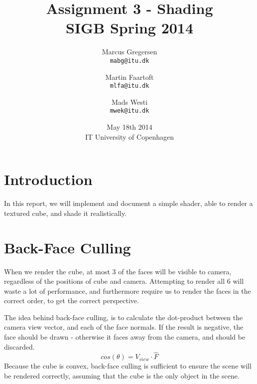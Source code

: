 \documentclass[a4paper,11pt]{article}
\begin{document}
\date{May 18th 2014\\ IT University of Copenhagen}
\title{Assignment 3 - Shading\\SIGB Spring 2014}

\author{Marcus Gregersen\\
\texttt{mabg@itu.dk}
\and Martin Faartoft\\
\texttt{mlfa@itu.dk}
\and Mads Westi\\
\texttt{mwek@itu.dk}}
\clearpage\maketitle
\thispagestyle{empty}
\setcounter{page}{1}
\newpage


\section{Introduction}
In this report, we will implement and document a simple shader, able to render a textured cube, and shade it realistically.

\section{Back-Face Culling}
When we render the cube, at most 3 of the faces will be visible to camera, regardless of the positions of cube and camera. Attempting to render all 6 will waste a lot of performance, and furthermore require us to render the faces in the correct order, to get the correct perspective.

The idea behind back-face culling, is to calculate the dot-product between the camera view vector, and each of the face normals. If the result is negative, the face should be drawn - otherwise it faces away from the camera, and should be discarded.
\[cos(\theta) = V_{view} \cdot \hat{F}\]
Because the cube is convex, back-face culling is sufficient to ensure the scene will be rendered correctly, assuming that the cube is the only object in the scene.
\end{document}
